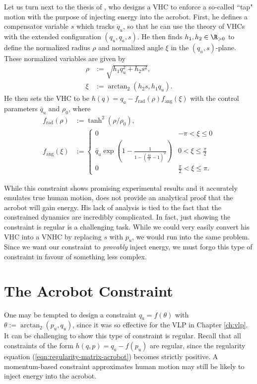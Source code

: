 Let us turn next to the thesis of \citet{xingbo_thesis}, who designs a VHC to enforce a
so-called ``tap" motion with the purpose of injecting energy into the acrobot. 
First, he defines a compensator variable \(s\) which tracks \(\dot{q}_u\), so
that he can use the theory of VHCs with the extended configuration 
\((q_u,q_a,s)\).
He then finds \(h_1, h_2 \in \R_{>0}\) to define the
normalized radius \(\rho\) and normalized angle \(\xi\) in the
\((q_u, s)\)-plane.
These normalized variables are given by
\begin{align*}
    \rho &:= \sqrt{h_1 q_u^2 + h_2 s^2}
    , \\
    \xi &:= \arctan_2(h_2 s, h_1 q_u)
    . 
\end{align*}
He then sets the VHC to be \(h(q) = q_a - f_\text{rad}(\rho)f_\text{ang}(\xi)\)
with the control parameters \(\bar{q}_u\) and \(\rho_0\), where
\begin{align}
    \label{eqn:xingbo-frad}
    f_\text{rad}(\rho) &:= \tanh^2(\rho/\rho_0)
    , \\
    \label{eqn:xingbo-fang}
    f_\text{ang}(\xi) &:= 
    \begin{cases}
        0 & -\pi < \xi \leq 0 \\
        \bar{q}_u \exp\left(1 - \frac{1}{1-(\frac{4\xi}{\pi} - 1)^2}\right) 
          & 0 < \xi \leq \frac{\pi}{2} \\
        0 & \frac{\pi}{2} < \xi \leq \pi
        .
    \end{cases}
\end{align}

While this constraint shows promising experimental results and it accurately
emulates true human motion, \citeauthor{xingbo_thesis}
does not provide an analytical proof that the acrobot will gain energy.
His lack of analysis is tied to the fact that the constrained
dynamics are incredibly complicated.
In fact, just showing the constraint is regular is a challenging task.
While we could very easily convert his VHC into a VNHC by replacing \(s\) with
\(p_u\), we would run into the same problem. 
Since we want our constraint to \textit{provably} inject energy, we must forgo
this type of constraint in favour of something less complex.

\section{The Acrobot Constraint}
One may be tempted to design a constraint \(q_a = f(\theta)\) 
with \(\theta := \arctan_2(p_u,q_u)\), since it was so effective for the VLP in
Chapter \ref{ch:vlp}.
It can be challenging to show this type of constraint is regular.
Recall that all constraints of the form \(h(q,p) = q_a - f(p_u)\)
are regular, since the regularity equation (\ref{eqn:regularity-matrix-acrobot})
becomes strictly positive.
A momentum-based constraint approximates human motion may still be likely to
inject energy into the acrobot.
 
